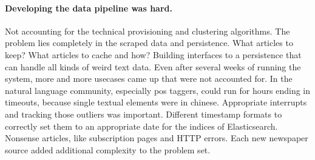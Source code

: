 \paragraph{Developing the data pipeline was hard.} Not accounting for the technical provisioning and clustering algorithms. The problem lies completely in the scraped data and persistence. What articles to keep? What articles to cache and how? Building interfaces to a persistence that can handle all kinds of weird text data. Even after several weeks of running the system, more and more usecases came up that were not accounted for. In the natural language community, especially pos taggers, could run for hours ending in timeouts, because single textual elements were in chinese. Appropriate interrupts and tracking those outliers was important. Different timestamp formats to correctly set them to an appropriate date for the indices of Elasticsearch. Nonsense articles, like subscription pages and HTTP errors. Each new newspaper source added additional complexity to the problem set.

